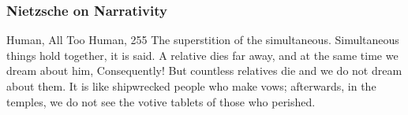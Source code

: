 \documentclass[xcolor=dvipsnames]{beamer}
\begin{document}


\begin{frame}
  \frametitle{Nietzsche on Narrativity}
  \begin{block}{Human, All Too Human, 255}
    The superstition of the simultaneous. Simultaneous things hold
    together, it is said. A relative dies far away, and at the same
    time we dream about him, Consequently! But countless relatives die
    and we do not dream about them. It is like shipwrecked people who
    make vows; afterwards, in the temples, we do not see the votive
    tablets of those who perished. 
  \end{block}
\end{frame}
\end{document}
